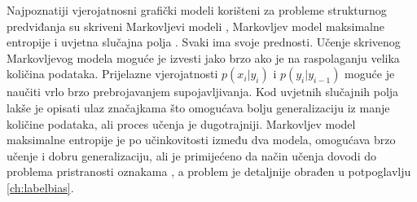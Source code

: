 Najpoznatiji vjerojatnosni grafički modeli korišteni za probleme strukturnog
predviđanja su skriveni Markovljevi modeli ,
Markovljev model maksimalne entropije 
i uvjetna slučajna polja . Svaki ima
svoje prednosti. Učenje skrivenog Markovljevog modela moguće je izvesti jako
brzo ako je na raspolaganju velika količina podataka. Prijelazne vjerojatnosti
$p(x_i | y_i)$ i $p(y_i | y_{i-1})$ moguće je naučiti vrlo brzo
prebrojavanjem supojavljivanja. Kod uvjetnih slučajnih polja lakše je opisati
ulaz značajkama što omogućava bolju generalizaciju iz manje količine podataka,
ali proces učenja je dugotrajniji. Markovljev model maksimalne entropije je po
učinkovitosti između dva modela, omogućava brzo učenje i dobru generalizaciju,
ali je primijećeno da način učenja dovodi do problema pristranosti oznakama
 \citep{lafferty2001conditional}, a problem je detaljnije
obrađen u potpoglavlju \ref{ch:labelbias}.


